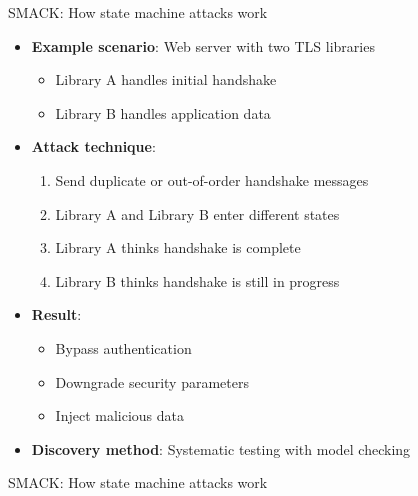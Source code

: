 \documentclass[aspectratio=169, lualatex, handout]{beamer}
\begin{document}
\begin{frame}{SMACK: How state machine attacks work}
	\begin{itemize}
		\item \textbf{Example scenario}: Web server with two TLS libraries
		      \begin{itemize}
			      \item Library A handles initial handshake
			      \item Library B handles application data
		      \end{itemize}
		\item \textbf{Attack technique}:
		      \begin{enumerate}
			      \item Send duplicate or out-of-order handshake messages
			      \item Library A and Library B enter different states
			      \item Library A thinks handshake is complete
			      \item Library B thinks handshake is still in progress
		      \end{enumerate}
		\item \textbf{Result}:
		      \begin{itemize}
			      \item Bypass authentication
			      \item Downgrade security parameters
			      \item Inject malicious data
		      \end{itemize}
		\item \textbf{Discovery method}: Systematic testing with model checking
	\end{itemize}
\end{frame}

\begin{frame}{SMACK: How state machine attacks work}
\end{frame}
\end{document}

